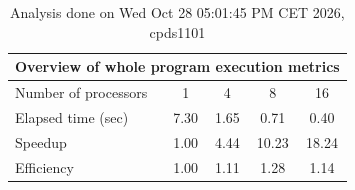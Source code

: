 \begin{table}[h]
\begin{center}
\begin{tabular}{|l|c|c|c|c|}
\hline
\multicolumn{5}{|c|}{Overview of whole program execution metrics} \\
\hline
\hline
Number of processors & 1 & 4 & 8 & 16 \\
\hline
Elapsed time (sec)      &       7.30 &       1.65 &       0.71 &       0.40 \\
\hline
Speedup                 &       1.00 &       4.44 &      10.23 &      18.24 \\
\hline
Efficiency              &       1.00 &       1.11 &       1.28 &       1.14 \\
\hline
\end{tabular}
\end{center}
\caption{ Analysis done on Wed Oct 28 05:01:45 PM CET 2026, cpds1101}
\end{table}
